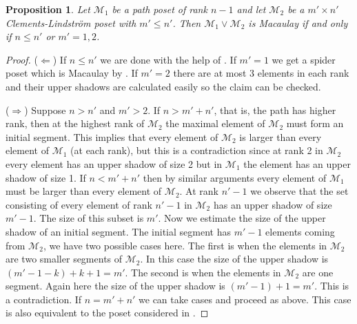 \documentclass[11pt, reqno]{amsart}
\newcommand{\M}{{\mathcal M}}
\theoremstyle{plain} %
\newtheorem{prop}[thm]{Proposition}
\theoremstyle{definition}
\theoremstyle{remark}
\numberwithin{equation}{section}  %
\begin{document}
\begin{prop}\label{prop: wedge of path and box}
    Let $\M_1$ be a path poset of rank $n-1$ and  let $\M_2$ be a $m'\times n'$ Clements-Lindstr\"om poset with $m' \leq n'$. Then $\M_1\vee\M_2$ is Macaulay if and only if $n \leq n'$ or $m' = 1,2$.
\end{prop}

\begin{proof}
($\Leftarrow$) If $n \leq n'$ we are done with the help of . If $m' = 1$ we get a spider poset which is Macaulay by \cite{BE}. If $m' = 2$ there are at most 3 elements in each rank and their upper shadows are calculated easily so the claim can be checked.

($\Rightarrow$) Suppose $n > n'$ and $m' > 2$. If $n > m' + n'$, that is, the path has higher rank, then at the highest rank of $\M_2$ the maximal element of $\M_2$ must form an initial segment. This implies that every element of $\M_2$ is larger than every element of $\M_1$ (at each rank), but this is a contradiction since at rank 2 in $\M_2$ every element has an upper shadow of size 2 but in $\M_1$ the element has an upper shadow of size 1. If $n < m' + n'$ then by similar arguments every element of $\M_1$ must be larger than every element of $\M_2$. At rank $n' - 1$ we observe that the set consisting of every element of rank $n'-1$ in $\M_2$ has an upper shadow of size $m' - 1$. The size of this subset is $m'$. Now we estimate the size of the upper shadow of an initial segment. The initial segment has $m'-1$ elements coming from $\M_2$, we have two possible cases here. The first is when the elements in $\M_2$ are two smaller segments of $\M_2$. In this case the size of the upper shadow is $(m' - 1 - k) + k + 1 = m'$. The second is when the elements in $\M_2$ are one segment. Again here the size of the upper shadow is $(m' - 1) + 1 = m'$. This is a contradiction. If $n = m' + n'$ we can take cases and proceed as above. This case is also equivalent to the poset considered in .
\end{proof}
\end{document}
